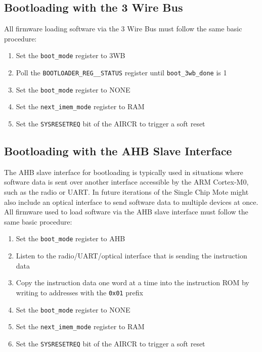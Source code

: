 \subsection{Bootloading with the 3 Wire Bus} \label{3wb-boot}
All firmware loading software via the 3 Wire Bus must follow the same basic procedure:

\begin{enumerate}
	\item Set the \texttt{boot\_mode} register to 3WB
	\item Poll the \texttt{BOOTLOADER\_REG\_\_STATUS} register until \texttt{boot\_3wb\_done} is 1
	\item Set the \texttt{boot\_mode} register to NONE
	\item Set the \texttt{next\_imem\_mode} register to RAM
	\item Set the \texttt{SYSRESETREQ} bit of the AIRCR to trigger a soft reset
\end{enumerate}

\subsection{Bootloading with the AHB Slave Interface}
The AHB slave interface for bootloading is typically used in situations where software data is sent over another interface accessible by the ARM Cortex-M0, such as the radio or UART.  In future iterations of the Single Chip Mote might also include an optical interface to send software data to multiple devices at once. All firmware used to load software via the AHB slave interface must follow the same basic procedure:

\begin{enumerate}
	\item Set the \texttt{boot\_mode} register to AHB
	\item Listen to the radio/UART/optical interface that is sending the instruction data
	\item Copy the instruction data one word at a time into the instruction ROM by writing to addresses with the \texttt{0x01} prefix
	\item Set the \texttt{boot\_mode} register to NONE
	\item Set the \texttt{next\_imem\_mode} register to RAM
	\item Set the \texttt{SYSRESETREQ} bit of the AIRCR to trigger a soft reset
\end{enumerate}

